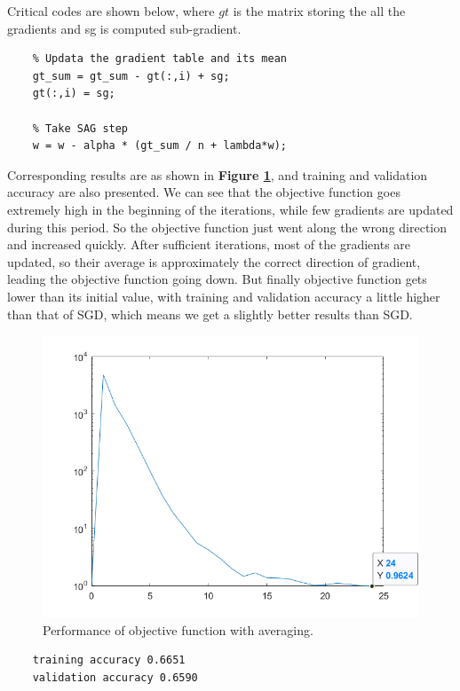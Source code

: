 \documentclass{article}
\begin{document}
Critical codes are shown below, where $gt$ is the matrix storing the all the gradients and sg is computed sub-gradient.

\begin{lstlisting}
    % Updata the gradient table and its mean
	gt_sum = gt_sum - gt(:,i) + sg;
	gt(:,i) = sg;
	
	% Take SAG step
	w = w - alpha * (gt_sum / n + lambda*w);
\end{lstlisting}

Corresponding results are as shown in \textbf{Figure \ref{fig18}}, and training and validation accuracy are also presented. We can see that the objective function goes extremely high in the beginning of the iterations, while few gradients are updated during this period. So the objective function just went along the wrong direction and increased quickly. After sufficient iterations, most of the gradients are updated, so their average is approximately the correct direction of gradient, leading the objective function going down. But finally objective function gets lower than its initial value, with training and validation accuracy a little higher than that of SGD, which means we get a slightly better results than SGD.

\begin{figure}[H]
	\centering
	\includegraphics[scale=0.5]{figure18}
	\caption{Performance of objective function with averaging.}
	\label{fig18}
\end{figure}

\begin{commandline}
	\begin{verbatim}
	training accuracy 0.6651
	validation accuracy 0.6590
	\end{verbatim}
\end{commandline}
\end{document}
